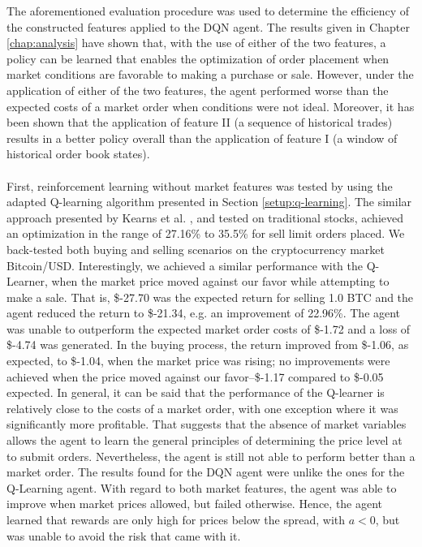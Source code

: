     The aforementioned evaluation procedure was used to determine the efficiency of the constructed features applied to the DQN agent.
    The results given in Chapter \ref{chap:analysis} have shown that, with the use of either of the two features, a policy can be learned that enables the  optimization of order placement when market conditions are favorable to making a purchase or sale.
    However, under the application of either of the two features, the agent performed worse than the expected costs of a market order when conditions were not ideal.
    Moreover, it has been shown that the application of feature II (a sequence of historical trades) results in a better policy overall than the application of feature I (a window of historical order book states).
    \\
    \\
    First, reinforcement learning without market features was tested by using the adapted Q-learning algorithm presented in Section \ref{setup:q-learning}.
    The similar approach presented by Kearns et al. \cite{nevmyvaka2006reinforcement}, and tested on traditional stocks, achieved an optimization in the range of 27.16\% to 35.5\% for sell limit orders placed.
    We back-tested both buying and selling scenarios on the cryptocurrency market Bitcoin/USD.
    Interestingly, we achieved a similar performance with the Q-Learner, when the market price moved against our favor while attempting to make a sale.
    That is, \$-27.70 was the expected return for selling 1.0 BTC and the agent reduced the return to \$-21.34, e.g. an improvement of 22.96\%.
    The agent was unable to outperform the expected market order costs of \$-1.72 and a loss of \$-4.74 was generated.
    In the buying process, the return improved from \$-1.06, as expected, to \$-1.04, when the market price was rising; no improvements were achieved when the price moved against our favor--\$-1.17 compared to \$-0.05 expected.
    In general, it can be said that the performance of the Q-learner is relatively close to the costs of a market order, with one exception where it was significantly more profitable.
    That suggests that the absence of market variables allows the agent to learn the general principles of determining the price level at to submit orders. Nevertheless, the agent is still not able to perform better than a market order.
    The results found for the DQN agent were unlike the ones for the Q-Learning agent. 
    With regard to both market features, the agent was able to improve when market prices allowed, but failed otherwise.
    Hence, the agent learned that rewards are only high for prices below the spread, with $a<0$, but was unable to avoid the risk that came with it.
